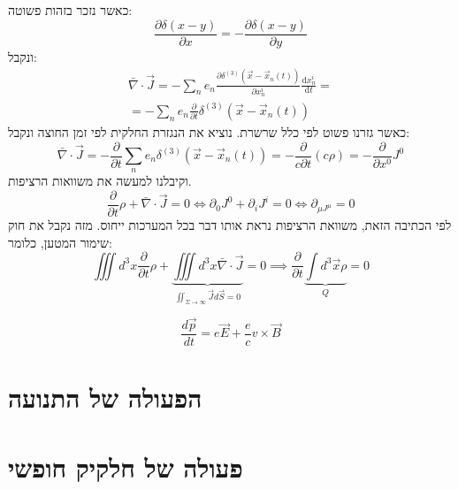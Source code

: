 \documentclass{tstextbook}
\begin{document}
כאשר נזכר בזהות פשוטה:
$$\frac{\partial \delta(x-y)}{\partial x}=-\frac{\partial \delta(x-y)}{\partial y}  $$
ונקבל:
\begin{gather*}\bar{\nabla} \cdot \vec{J}=-\sum_{n}e_{n}\frac{\partial \delta^{(3)}\left( \vec{x}-\vec{x}_{n}(t) \right)}{\partial x_{n}^i} \frac{\mathrm{d}x_{n}^i}{\mathrm{d}t} = \\= -\sum_{n} e_{n} \frac{\partial }{\partial t} \delta^{(3)}\left( \vec{x}-\vec{x}_{n}(t) \right)
\end{gather*}
כאשר גזרנו פשוט לפי כלל שרשרת. נוציא את הנגזרת החלקית לפי זמן החוצה ונקבל:
$$\bar{\nabla} \cdot \vec{J}=-\frac{\partial }{\partial t} \sum_{n} e_{n} \delta^{(3)}\left( \vec{x}-\vec{x}_{n}(t) \right) = -\frac{\partial }{c\partial t} \left( c\rho \right)=-\frac{\partial }{\partial x^0} J^0$$
וקיבלנו למעשה את משוואות הרציפות.
$$\frac{\partial }{\partial t} \rho + \bar{\nabla} \cdot \vec{J}=0 \iff \partial_{0}J^0+\partial_{i}J^i =0 \iff \partial_{\mu J^\mu} = 0$$
לפי הכתיבה הזאת, משוואת הרציפות נראת אותו דבר בכל המערכות ייחוס. מזה נקבל את חוק שימור המטען, כלומר:
$$\iiint d^3 x\frac{\partial }{\partial t} \rho + \underbrace{ \iiint d^3 x \bar{\nabla} \cdot \vec{J} }_{ \iint_{\Sigma\to \infty} \vec{J} d\vec{S}=0 }=0 \implies \frac{\partial }{\partial t} \underbrace{ \int d^3 \vec{x} \rho }_{ Q } = 0$$

\begin{theorem}
$${\frac{d{\vec{p}}}{d t}}=e{\vec{E}}+{\frac{e}{c}}v\times{\vec{B}}$$

\end{theorem}
\section{הפעולה של התנועה}

\section{פעולה של חלקיק חופשי}
\end{document}
